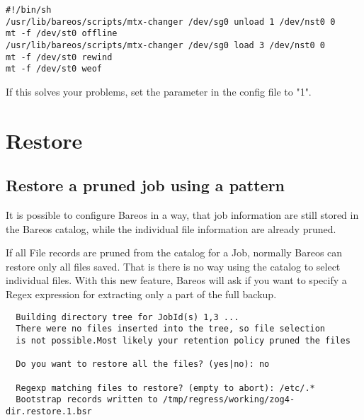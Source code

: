 \footnotesize
\begin{verbatim}
#!/bin/sh
/usr/lib/bareos/scripts/mtx-changer /dev/sg0 unload 1 /dev/nst0 0
mt -f /dev/st0 offline
/usr/lib/bareos/scripts/mtx-changer /dev/sg0 load 3 /dev/nst0 0
mt -f /dev/st0 rewind
mt -f /dev/st0 weof
\end{verbatim}
\normalsize

If this solves your problems, set the parameter  in the config file  to "1".





\section{Restore}

\subsection{Restore a pruned job using a pattern}

  It is possible to configure Bareos in a way,
  that job information are still stored in the Bareos catalog,
  while the individual file information are already pruned.

  If all File records are pruned from the catalog
  for a Job, normally Bareos can restore only all files saved. That
  is there is no way using the catalog to select individual files.
  With this new feature, Bareos will ask if you want to specify a Regex
  expression for extracting only a part of the full backup.

\begin{verbatim}
  Building directory tree for JobId(s) 1,3 ...
  There were no files inserted into the tree, so file selection
  is not possible.Most likely your retention policy pruned the files

  Do you want to restore all the files? (yes|no): no

  Regexp matching files to restore? (empty to abort): /etc/.*
  Bootstrap records written to /tmp/regress/working/zog4-dir.restore.1.bsr
\end{verbatim}

